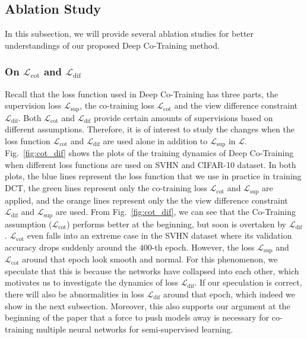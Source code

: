 \documentclass[runningheads]{llncs}
\begin{document}
\subsection{Ablation Study}
In this subsection, we will provide several ablation studies for better understandings of our proposed Deep Co-Training method.

\vspace{-0.05in}\subsubsection{On $\mathcal{L}_{\text{cot}}$ and $\mathcal{L}_{\text{dif}}$}
Recall that the loss function used in Deep Co-Training has three parts, the supervision loss $\mathcal{L}_{\text{sup}}$, the co-training loss $\mathcal{L}_{\text{cot}}$ and the view difference constraint $\mathcal{L}_{\text{dif}}$.
Both $\mathcal{L}_{\text{cot}}$ and $\mathcal{L}_{\text{dif}}$ provide certain amounts of supervisions based on different assumptions.
Therefore, it is of interest to study the changes when the loss function $\mathcal{L}_{\text{cot}}$ and $\mathcal{L}_{\text{dif}}$ are used alone in addition to $\mathcal{L}_{\text{sup}}$ in $\mathcal{L}$.
Fig.~\ref{fig:cot_dif} shows the plots of the training dynamics of Deep Co-Training when different loss functions are used on SVHN and CIFAR-10 dataset.
In both plots, the blue lines represent the loss function that we use in practice in training DCT, the green lines represent only the co-training loss $\mathcal{L}_{\text{cot}}$ and $\mathcal{L}_{\text{sup}}$ are applied, and the orange lines represent only the the view difference constraint $\mathcal{L}_{\text{dif}}$ and $\mathcal{L}_{\text{sup}}$ are used.
From Fig.~\ref{fig:cot_dif}, we can see that the Co-Training assumption ($\mathcal{L}_{\text{cot}}$) performs better at the beginning, but soon is overtaken by $\mathcal{L}_{\text{dif}}$.
$\mathcal{L}_{\text{cot}}$ even falls into an extreme case in the SVHN dataset where its validation accuracy drops suddenly around the $400$-th epoch.
However, the loss $\mathcal{L}_{\text{sup}}$ and  $\mathcal{L}_{\text{cot}}$ around that epoch look smooth and normal.
For this phenomenon, we speculate that this is because the networks have collapsed into each other, which motivates us to investigate the dynamics of loss $\mathcal{L}_{\text{dif}}$.
If our speculation is correct, there will also be abnormalities in loss $\mathcal{L}_{\text{dif}}$ around that epoch, which indeed we show in the next subsection.
Moreover, this also supports our argument at the beginning of the paper that a force to push models away is necessary for co-training multiple neural networks for semi-supervised learning.
\end{document}
